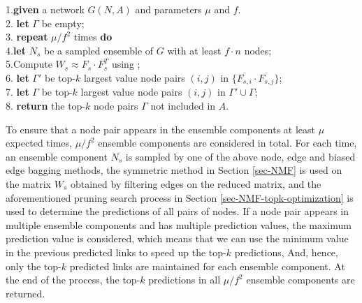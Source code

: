 \begin{tabbing}1.\hspace{1ex}\=
 {\bf given} a network $G(N, A)$ and parameters $\mu$ and $f$.\\
2.\> {\bf let} $\Gamma$ be empty;\\
3.\> {\bf repeat} $\mu/f^2$  times {\bf do} \\
4.\>\hspace{2ex}\= {\bf let} $N_s$ be a sampled ensemble of $G$ with at least $f\cdot n$ nodes; \\
5.\>\>Compute $W_s \approx F_s\cdot F_s^T$ using \NMF; \\
6.\>\> {\bf let} $\Gamma'$ be top-$k$ largest value node pairs $(i,j)$ in $\{\overline{F_{s,i}} \cdot \overline{F_{s,j}}\}$;\\
7.\>\> {\bf let} $\Gamma$ be top-$k$ largest value node pairs $(i,j)$ in $\Gamma'\cup\Gamma$;\\
8.\> {\bf return} the top-$k$ node pairs $\Gamma$ not included in $A$.
\end{tabbing}


To ensure that a node pair appears in the ensemble components at least $\mu$ expected times,  $\mu / f^{2}$ ensemble components are considered in total.
For each time, an ensemble component $N_s$ is sampled by one of the above
node, edge and biased edge bagging methods, the symmetric \NMF method in Section \ref{sec-NMF} is used on the matrix $W_s$ obtained
by filtering edges on the reduced matrix, and the aforementioned
pruning search process in Section \ref{sec-NMF-topk-optimization} is used to determine the predictions of
all pairs of nodes. If a node pair appears in multiple ensemble components and has multiple
prediction values, the maximum prediction value is considered, which means that we can use the
minimum value in the previous predicted links to speed up the top-$k$ predictions,  
And, hence, only the top-$k$ predicted links are maintained for each ensemble component.
At the end of the process, the top-$k$ predictions in all $\mu / f^{2}$ ensemble components are returned.




